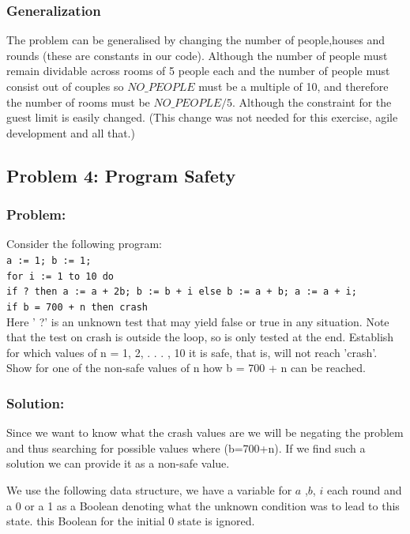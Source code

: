 \documentclass[12pt]{article}
\begin{document}
\subsubsection*{Generalization}

The problem can be generalised by changing the number of people,houses and rounds (these are constants in our code). Although the number of people must remain dividable across rooms of 5 people each and the number of people must consist out of couples so $NO\_PEOPLE$ must be a multiple of 10, and therefore the number of rooms must be $NO\_PEOPLE /5$. Although the constraint for the guest limit is easily changed. (This change was not needed for this exercise, agile development and all that.)


\subsection*{Problem 4: Program Safety}

\subsubsection*{Problem:}
Consider the following program:\\
{\tt a := 1; b := 1; \\
for i := 1 to 10 do \\
\indent if ? then {a := a + 2b; b := b + i} else {b := a + b; a := a + i}; \\
if b = 700 + n then crash}\\

Here ’ ?’ is an unknown test that may yield false or true in any situation. Note that the test
on crash is outside the loop, so is only tested at the end.
Establish for which values of n = 1, 2, . . . , 10 it is safe, that is, will not reach ’crash’. Show
for one of the non-safe values of n how b = 700 + n can be reached.

\subsubsection*{Solution:}
Since we want to know what the crash values are we will be negating the problem and thus searching for possible values where (b=700+n). If we find such a solution we can provide it as a non-safe value.

We use the following data structure, we have a variable for $a$ ,$b$, $i$ each round and a 0 or a 1 as a Boolean denoting what the unknown condition was to lead to this state. this Boolean for the initial 0 state is ignored.
\end{document}
